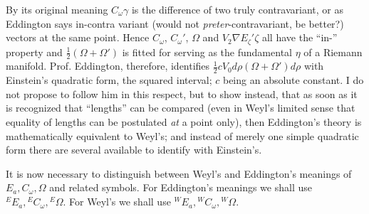 \documentclass[11pt]{article}
\begin{document}
\indent By its original meaning $C_\omega\gamma$ is the difference of two truly contravariant, or as Eddington says in-contra variant (would not \emph{preter}-contravariant, be better?) vectors at the same point. Hence $C_\omega$, $C_\omega'$, $\Omega$ and $V_2\nabla E_\zeta'\zeta$ all have the ``in-'' property and $\tfrac12(\Omega+\Omega')$ is fitted for serving as the fundamental $\eta$ of a Riemann manifold. Prof. Eddington, therefore, identifies
$\tfrac12cV_0d\rho(\Omega+\Omega')d\rho$ with Einstein's quadratic form, the squared interval; $c$ being an absolute constant. I do not propose to follow him in this respect, but to show instead, that as soon as it is recognized that ``lengths'' can be compared (even in Weyl's limited sense that equality of lengths can be postulated \emph{at} a point only), then Eddington's theory is mathematically equivalent to Weyl's; and instead of merely one simple quadratic form there are several available to identify with Einstein's.

\indent It is now necessary to distinguish between Weyl's and Eddington's meanings of $E_a,C_\omega,\Omega$ and related symbols. For Eddington's meanings we shall use ${}^E E_a,{}^E C_\omega,{}^E\Omega$. For Weyl's we shall use ${}^W E_a,{}^W C_\omega,{}^W\Omega$.
\end{document}
